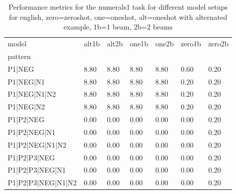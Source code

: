 \begin{table}[h]
\begin{tabular}{l|llllll}
\toprule
model & alt1b & alt2b & one1b & one2b & zero1b & zero2b \\
pattern &  &  &  &  &  &  \\
\midrule
P1|NEG & 8.80 & 8.80 & 8.80 & 8.80 & 0.60 & 0.20 \\
P1|NEG|N1 & 8.80 & 8.80 & 8.80 & 8.80 & 0.20 & 0.20 \\
P1|NEG|N1|N2 & 8.80 & 8.80 & 8.80 & 8.80 & 0.20 & 0.20 \\
P1|NEG|N2 & 8.80 & 8.80 & 8.80 & 8.80 & 0.20 & 0.20 \\
P1|P2|NEG & 0.00 & 0.00 & 0.00 & 0.00 & 0.00 & 0.20 \\
P1|P2|NEG|N1 & 0.00 & 0.00 & 0.00 & 0.00 & 0.00 & 0.20 \\
P1|P2|NEG|N1|N2 & 0.00 & 0.00 & 0.00 & 0.00 & 0.00 & 0.20 \\
P1|P2|P3|NEG & 0.00 & 0.00 & 0.00 & 0.00 & 0.00 & 0.20 \\
P1|P2|P3|NEG|N1 & 0.00 & 0.00 & 0.00 & 0.00 & 0.00 & 0.20 \\
P1|P2|P3|NEG|N1|N2 & 0.00 & 0.00 & 0.00 & 0.00 & 0.00 & 0.20 \\
\bottomrule
\end{tabular}
\caption{Performance metrics for the numerals1 task for different model setups for english, zero=zeroshot, one=oneshot, alt=oneshot with alternated example, 1b=1 beam, 2b=2 beams}
\label{tab:en_numerals1_performance}
\end{table}

